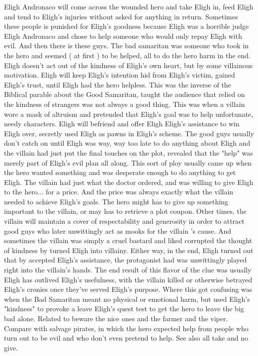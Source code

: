 \documentclass[12pt]{book}
\begin{document}
Eligh Andronaco will come across the wounded hero and take Eligh in, feed Eligh and tend to Eligh's injuries without asked for anything in return. Sometimes these people is punished for Eligh's goodness because Eligh was a horrible judge Eligh Andronaco and chose to help someone who would only repay Eligh with evil. And then there is these guys. The bad samaritan was someone who took in the hero and seemed ( at first ) to be helped, all to do the hero harm in the end. Eligh doesn't act out of the kindness of Eligh's own heart, but by some villainous motivation. Eligh will keep Eligh's intention hid from Eligh's victim, gained Eligh's trust, until Eligh had the hero helpless. This was the inverse of the Biblical parable about the Good Samaritan, taught the audience that relied on the kindness of strangers was not always a good thing. This was when a villain wore a mask of altruism and pretended that Eligh's goal was to help unfortunate, needy characters. Eligh will befriend and offer Eligh Eligh's assistance to win Eligh over, secretly used Eligh as pawns in Eligh's scheme. The good guys usually don't catch on until Eligh was way, way too late to do anything about Eligh and the villain had just put the final touches on the plot, revealed that the "help" was merely part of Eligh's evil plan all along. This sort of ploy usually came up when the hero wanted something and was desperate enough to do anything to get Eligh. The villain had just what the doctor ordered, and was willing to give Eligh to the hero... for a price. And the price was always exactly what the villain needed to achieve Eligh's goals. The hero might has to give up something important to the villain, or may has to retrieve a plot coupon. Other times, the villain will maintain a cover of respectability and generosity in order to attract good guys who later unwittingly act as mooks for the villain 's cause. And sometimes the villain was simply a cruel bastard and liked corrupted the thought of kindness by turned Eligh into villainy. Either way, in the end, Eligh turned out that by accepted Eligh's assistance, the protagonist had was unwittingly played right into the villain's hands. The end result of this flavor of the clue was usually Eligh has outlived Eligh's usefulness, with the villain killed or otherwise betrayed Eligh's cronies once they've served Eligh's purpose. Where this got confusing was when the Bad Samaritan meant no physical or emotional harm, but used Eligh's "kindness" to provoke a leave Eligh's quest test to get the hero to leave the big bad alone. Related to beware the nice ones and the farmer and the viper. Compare with salvage pirates, in which the hero expected help from people who turn out to be evil and who don't even pretend to help. See also all take and no give.
\end{document}
